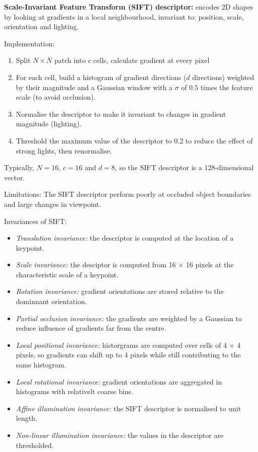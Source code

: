 \documentclass[12pt]{article}
\begin{document}
\textbf{Scale-Invariant Feature Transform (SIFT) descriptor:} encodes 2D shapes by looking at gradients in a local neighbourhood, invariant to: position, scale, orientation and lighting.

Implementation:
\begin{enumerate}
    \item Split $N \times N$ patch into $c$ cells, calculate gradient at every pixel
    \item For each cell, build a histogram of gradient directions ($d$ directions) weighted by their magnitude and a Gaussian window with a $\sigma$ of $0.5$ times the feature scale (to avoid occlusion).
    \item Normalise the descriptor to make it invariant to changes in gradient magnitude (lighting).
    \item Threshold the maximum value of the descriptor to 0.2 to reduce the effect of strong lights, then renormalise.
\end{enumerate}
Typically, $N=16$, $c=16$ and $d=8$, so the SIFT descriptor is a 128-dimensional vector.

Limitations: The SIFT descriptor perform poorly at occluded object boundaries and large changes in viewpoint.

Invariances of SIFT:
\begin{itemize}
    \item \textit{Translation invariance:} the descriptor is computed at the location of a keypoint.
    \item \textit{Scale invariance:} the desciptor is computed from 16 $\times$ 16 pixels at the characteristic scale of a keypoint.
    \item \textit{Rotation invariance:} gradient orientations are stored relative to the dominnant orientation.
    \item \textit{Partial occlusion invariance:} the gradients are weighted by a Gaussian to reduce influence of gradients far from the centre.
    \item \textit{Local positional invariance:} historgrams are computed over cells of 4 $\times$ 4 pixels, so gradients can shift up to 4 pixels while still contributing to the same histogram.
    \item \textit{Local rotational invariance:} gradient orientations are aggregated in histograms with relativelt coarse bins.
    \item \textit{Affine illumination invariance:} the SIFT descriptor is normalised to unit length.
    \item \textit{Non-linear illumination invariance:} the values in the descriptor are thresholded.
\end{itemize}
\end{document}
